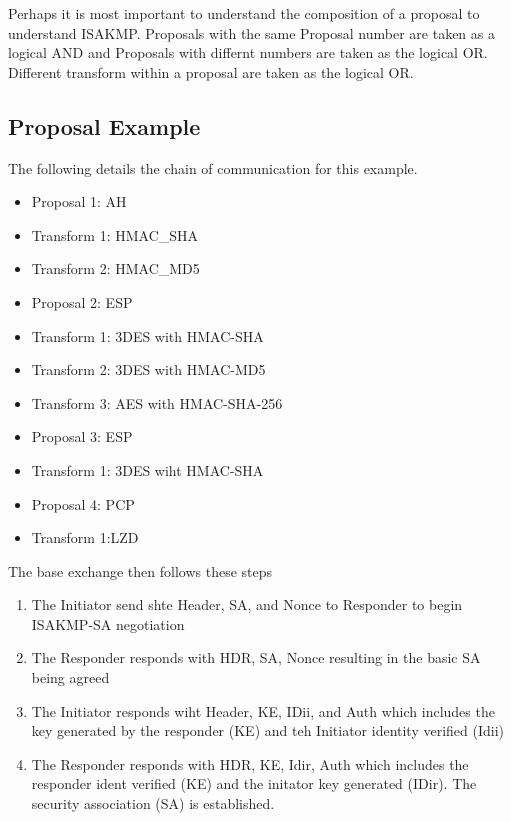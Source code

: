 \documentclass{article}
\begin{document}
Perhaps it is most important to understand the composition of a proposal to understand ISAKMP. Proposals with the same Proposal number are taken as a logical AND and Proposals with differnt numbers are taken as the logical OR. Different transform within a proposal are taken as the logical OR. 

\subsection {Proposal Example}

The following details the chain of communication for this example. 

\begin{itemize}
\item Proposal 1: AH
\item Transform 1: HMAC_SHA
\item Transform 2: HMAC_MD5
\item Proposal 2: ESP
\item Transform 1: 3DES with HMAC-SHA
\item Transform 2: 3DES with HMAC-MD5
\item Transform 3: AES with HMAC-SHA-256
\item Proposal 3: ESP
\item Transform 1: 3DES wiht HMAC-SHA
\item Proposal 4: PCP
\item Transform 1:LZD
\end{itemize}

The base exchange then follows these steps
\begin{enumerate}
\item The Initiator send shte Header, SA, and Nonce to Responder to begin ISAKMP-SA negotiation
\item The Responder responds with HDR, SA, Nonce resulting in the basic SA being agreed 
\item The Initiator responds wiht Header, KE, IDii, and Auth which includes the key generated by the responder (KE) and teh Initiator identity verified (Idii)
\item The Responder responds with HDR, KE, Idir, Auth which includes the responder ident verified (KE) and the initator key generated (IDir). The security association (SA) is established. 
\end{enumerate}
\end{document}
